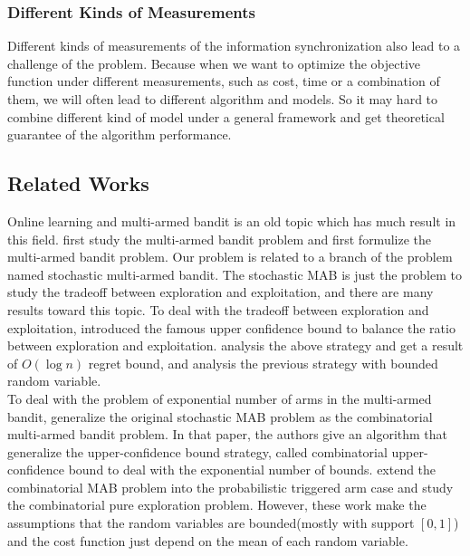 \documentclass{article}
\theoremstyle{plain}
\theoremstyle{definition}
\theoremstyle{remark}
\begin{document}
    \subsubsection{Different Kinds of Measurements}
    Different kinds of measurements of the information synchronization also lead to a challenge of the problem. Because when we want to optimize the objective function under different measurements, such as cost, time or a combination of them, we will often lead to different algorithm and models. So it may hard to combine different kind of model under a general framework and get theoretical guarantee of the algorithm performance.

    \subsection{Related Works}
    Online learning and multi-armed bandit is an old topic which has much result in this field. \citet{Thompson:10.2307/2332286} first study the multi-armed bandit problem and \citet{robbins1985some} first formulize the multi-armed bandit problem. Our problem is related to a branch of the problem named stochastic multi-armed bandit. The stochastic MAB is just the problem to study the tradeoff between exploration and exploitation, and there are many results toward this topic. To deal with the tradeoff between exploration and exploitation, \citet{Lai:1985:AEA:2609660.2609757} introduced the famous upper confidence bound to balance the ratio between exploration and exploitation. \citet{Agrawal1995} analysis the above strategy and get a result of $O(\log n)$ regret bound, and \citet{Auer:2002:FAM:599614.599677} analysis the previous strategy with bounded random variable.\\

    To deal with the problem of exponential number of arms in the multi-armed bandit, \citet{pmlr-v28-chen13a} generalize the original stochastic MAB problem as the combinatorial multi-armed bandit problem. In that paper, the authors give an algorithm that generalize the upper-confidence bound strategy, called combinatorial upper-confidence bound to deal with the exponential number of bounds. \citet{DBLP:journals/corr/ChenWY14a} extend the combinatorial MAB problem into the probabilistic triggered arm case and \citet{Chen:2014:CPE:2968826.2968869} study the combinatorial pure exploration problem. However, these work make the assumptions that the random variables are bounded(mostly with support $[0,1]$) and the cost function just depend on the mean of each random variable.\\
\end{document}
